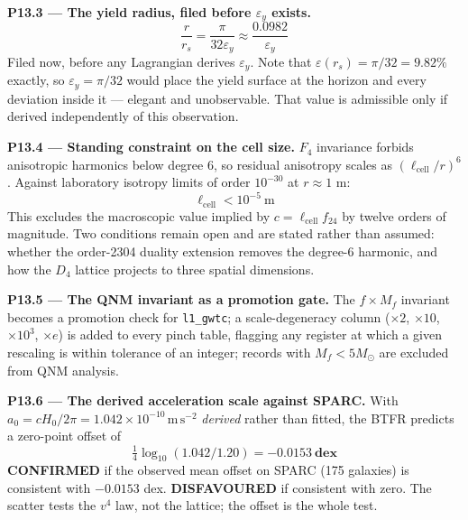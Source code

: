\documentclass[11pt, letterpaper, openany]{book}
\begin{document}
\begin{predictionbox}
\textbf{P13.3 --- The yield radius, filed before $\varepsilon_y$ exists.}
\[ \frac{r}{r_s} = \frac{\pi}{32\varepsilon_y} \approx \frac{0.0982}{\varepsilon_y} \]
Filed now, before any Lagrangian derives $\varepsilon_y$. Note that
$\varepsilon(r_s) = \pi/32 = 9.82\%$ exactly, so $\varepsilon_y = \pi/32$ would place the yield
surface at the horizon and every deviation inside it --- elegant and unobservable. That value is
admissible only if derived independently of this observation.
\end{predictionbox}

\begin{predictionbox}
\textbf{P13.4 --- Standing constraint on the cell size.} $F_4$ invariance forbids anisotropic
harmonics below degree 6, so residual anisotropy scales as $(\ell_{\mathrm{cell}}/r)^6$. Against
laboratory isotropy limits of order $10^{-30}$ at $r \approx 1$ m:
\[ \boxed{\;\ell_{\mathrm{cell}} < 10^{-5}\ \mathrm{m}\;} \]
This excludes the macroscopic value implied by $c = \ell_{\mathrm{cell}}f_{24}$ by twelve orders of
magnitude. Two conditions remain open and are stated rather than assumed: whether the order-2304
duality extension removes the degree-6 harmonic, and how the $D_4$ lattice projects to three spatial
dimensions.
\end{predictionbox}

\begin{predictionbox}
\textbf{P13.5 --- The QNM invariant as a promotion gate.} The $f \times M_f$ invariant becomes a
promotion check for \texttt{l1\_gwtc}; a scale-degeneracy column ($\times 2$, $\times 10$,
$\times 10^3$, $\times e$) is added to every pinch table, flagging any register at which a given
rescaling is within tolerance of an integer; records with $M_f < 5 M_\odot$ are excluded from QNM
analysis.
\end{predictionbox}

\begin{predictionbox}
\textbf{P13.6 --- The derived acceleration scale against SPARC.} With
$a_0 = cH_0/2\pi = 1.042\times10^{-10}\,\mathrm{m\,s^{-2}}$ \emph{derived} rather than fitted, the
BTFR predicts a zero-point offset of
\[ \tfrac{1}{4}\log_{10}(1.042/1.20) = \mathbf{-0.0153\ \text{dex}} \]
\textbf{CONFIRMED} if the observed mean offset on SPARC (175 galaxies) is consistent with
$-0.0153$ dex. \textbf{DISFAVOURED} if consistent with zero. The scatter tests the $v^4$ law, not
the lattice; the offset is the whole test.
\end{predictionbox}
\end{document}
